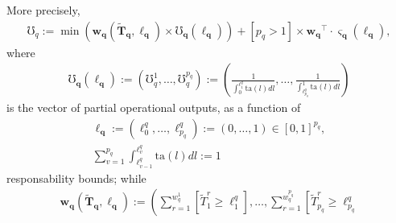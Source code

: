 \documentclass[hidelinks, nonatbib]{elsarticle}
\begin{document}
\begin{axiom}
\begin{subaxiom}
    More precisely,
    \begin{gather}
        \mho_q
        :=
        \min\left(
            \boldsymbol{w_{q}}(
                \boldsymbol{\tilde{T}_{q}}
                ,
                \boldsymbol{\ell_{q}}
            )
            \times
            \boldsymbol{\mho_{q}}(
                \boldsymbol{\ell_{q}}
            )
        \right)
        +
        [p_q > 1]
        \times
        \boldsymbol{w_{q}} ^ {\top}
        \cdot 
        \boldsymbol{\varsigma_{q}}(
            \boldsymbol{\ell_{q}}
        )
        ,
    \end{gather}
    where
    \begin{gather}
        \boldsymbol{\mho_{q}}(
            \boldsymbol{\ell_{q}}
        )
        :=
        \left(
            \mho_{q}^{1}
            ,
            \dots
            ,
            \mho_{q}^{p_q}
        \right)
        :=
        \left(
            \frac{1}{
                \int_{0}^{\ell_{1}^{q}}
                \text{ta}(l)dl
            }
            ,
            \dots
            ,
            \frac{1}{
                \int_{\ell_{p_q}^{q}}^{1}
                \text{ta}(l)dl
            }
        \right)
    \end{gather}
    is the vector of partial operational outputs, as a function of
    \begin{gather}
        \boldsymbol{\ell_q}
        :=
        \left(
            \ell_{0}^{q}
            ,
            \dots
            ,
            \ell_{p_q}^{q}
        \right)
        :=
        \left(
            0
            ,
            \dots
            ,
            1
        \right)
        \in
        [0,1] ^ {p_q}
        ,
        \\
        \sum_{v=1}^{p_q}{
            \int_{
                \ell_{v-1}^{q}
            }^{
                \ell_{v}^{q}
            }
            \text{ta}(l)dl
        }
        :=
        1
    \end{gather}
    responsability bounds; while
    \begin{gather}
        \boldsymbol{w_{q}}(
            \boldsymbol{\tilde{T}_{q}},
            \boldsymbol{\ell_{q}}
        )
        :=
        \left(
            \sum_{r=1}^{w_{q}^{1}}
            \left[
                \tilde{T}_{1}^{r}
                \geq
                \ell_{1}^{q}
            \right]
            ,
            \dots
            ,
            \sum_{r=1}^{w_{q}^{p_q}}
            \left[
                \tilde{T}_{p_q}^{r}
                \geq
                \ell_{p_q}^{q}

\end{gather}
\end{subaxiom}
\end{axiom}
\end{document}
